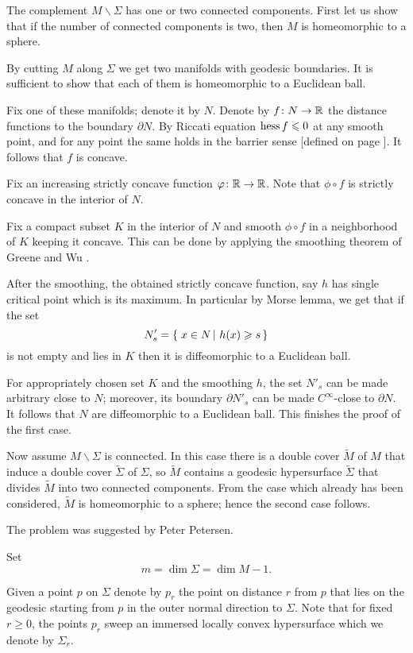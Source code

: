 The complement $M\backslash\Sigma$ has one or two connected components.
First let us show that if the number of connected components is two, 
then $M$ is homeomorphic to a sphere.

By cutting $M$ along $\Sigma$ 
we get two manifolds
with geodesic boundaries.
It is sufficient to show that each of them is homeomorphic to a Euclidean ball.

Fix one of these manifolds; denote it by $N$.
Denote by $f\:N\z\to\RR$ the distance functions to the boundary $\partial N$.
By Riccati equation $\operatorname{\rm hess}\nolimits f\leqslant 0$ at any smooth point,
and for any point the same holds in the barrier sense [defined on page \pageref{page:barrier sense}].
It follows that $f$ is concave.

Fix an increasing strictly concave function $\varphi\colon\mathbb{R}\to\mathbb{R}$.
Note that $\phi\circ f$ is strictly concave in the interior of $N$.

Fix a compact subset $K$ in the interior of $N$ and
smooth $\phi\circ f$ in a neighborhood of $K$ keeping it concave. 
This can be done by applying the smoothing theorem of Greene and Wu \cite[see Theorem~2 in][]{greene-wu}.

After the smoothing, the obtained strictly concave function, say $h$ has single critical point which is its maximum.
In particular by Morse lemma, we get that if the set  
\[N'_s=\set{x\in N}{h(x)\ge s}\]
is not empty and lies in $K$ then it is diffeomorphic to a Euclidean ball.

For appropriately chosen set $K$ and the smoothing $h$, the set $N'_s$ can be made arbitrary close to $N$;
moreover, its boundary $\partial N'_s$ can be made $C^\infty$-close to $\partial N$.
It follows that $N$ are diffeomorphic to a Euclidean ball.
This finishes the proof of the first case.

Now assume $M\backslash\Sigma$ is connected.
In this case there is a double cover $\tilde M$ of $M$ that induce a double cover $\tilde\Sigma$ of $\Sigma$,
so $\tilde M$ contains a geodesic hypersurface $\tilde\Sigma$ that divides $\tilde M$ into two connected components. 
From the case which already has been considered, $\tilde M$ is homeomorphic to a sphere;
hence the second case follows.
\qeds

The problem was suggested by Peter Petersen.



Set 
\[m=\dim \Sigma=\dim M-1.\]

Given a point $p$ on $\Sigma$ 
denote by $p_r$ the point on distance $r$ from $p$
that lies on the geodesic starting from $p$ in the outer normal direction to $\Sigma$.
Note that for fixed $r\ge 0$,
the points $p_r$ sweep an immersed locally convex hypersurface which we denote by $\Sigma_r$.



